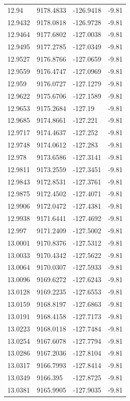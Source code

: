 \begin{table}[H]
\begin{tabular}{llll}
12.94 & 9178.4833 & -126.9418 & -9.81 \\
12.9432 & 9178.0818 & -126.9728 & -9.81 \\
12.9464 & 9177.6802 & -127.0038 & -9.81 \\
12.9495 & 9177.2785 & -127.0349 & -9.81 \\
12.9527 & 9176.8766 & -127.0659 & -9.81 \\
12.9559 & 9176.4747 & -127.0969 & -9.81 \\
12.959 & 9176.0727 & -127.1279 & -9.81 \\
12.9622 & 9175.6706 & -127.1589 & -9.81 \\
12.9653 & 9175.2684 & -127.19 & -9.81 \\
12.9685 & 9174.8661 & -127.221 & -9.81 \\
12.9717 & 9174.4637 & -127.252 & -9.81 \\
12.9748 & 9174.0612 & -127.283 & -9.81 \\
12.978 & 9173.6586 & -127.3141 & -9.81 \\
12.9811 & 9173.2559 & -127.3451 & -9.81 \\
12.9843 & 9172.8531 & -127.3761 & -9.81 \\
12.9875 & 9172.4502 & -127.4071 & -9.81 \\
12.9906 & 9172.0472 & -127.4381 & -9.81 \\
12.9938 & 9171.6441 & -127.4692 & -9.81 \\
12.997 & 9171.2409 & -127.5002 & -9.81 \\
13.0001 & 9170.8376 & -127.5312 & -9.81 \\
13.0033 & 9170.4342 & -127.5622 & -9.81 \\
13.0064 & 9170.0307 & -127.5933 & -9.81 \\
13.0096 & 9169.6272 & -127.6243 & -9.81 \\
13.0128 & 9169.2235 & -127.6553 & -9.81 \\
13.0159 & 9168.8197 & -127.6863 & -9.81 \\
13.0191 & 9168.4158 & -127.7173 & -9.81 \\
13.0223 & 9168.0118 & -127.7484 & -9.81 \\
13.0254 & 9167.6078 & -127.7794 & -9.81 \\
13.0286 & 9167.2036 & -127.8104 & -9.81 \\
13.0317 & 9166.7993 & -127.8414 & -9.81 \\
13.0349 & 9166.395 & -127.8725 & -9.81 \\
13.0381 & 9165.9905 & -127.9035 & -9.81 \\

\end{tabular}
\end{table}

